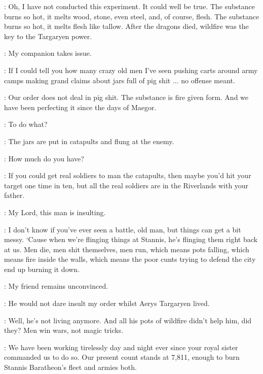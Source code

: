 \HALLYN: Oh, I have not conducted this experiment. It could well be true. The substance burns so hot, it melts wood, stone, even steel, and, of course, flesh. The substance burns so hot, it melts flesh like tallow. After the dragons died, wildfire was the key to the Targaryen power. 


\TYRION: My companion takes issue. 

\BRONN: If I could tell you how many crazy old men I've seen pushing carts around army camps making grand claims about jars full of pig shit $\ldots$ no offense meant. 

\HALLYN: Our order does not deal in pig shit. The substance is fire given form. And we have been perfecting it since the days of Maegor. 

\BRONN: To do what? 

\HALLYN: The jars are put in catapults and flung at the enemy. 

\TYRION: How much do you have? 


\BRONN: If you could get real soldiers to man the catapults, then maybe you'd hit your target one time in ten, but all the real soldiers are in the Riverlands with your father. 

\HALLYN: My Lord, this man is insulting. 


\BRONN: I don't know if you've ever seen a battle, old man, but things can get a bit messy. `Cause when we're flinging things at Stannis, he's flinging them right back at us. Men die, men shit themselves, men run, which means pots falling, which means fire inside the walls, which means the poor cunts trying to defend the city end up burning it down. 

\TYRION: My friend remains unconvinced. 

\HALLYN: He would not dare insult my order whilst Aerys Targaryen lived. 

\BRONN: Well, he's not living anymore. And all his pots of wildfire didn't help him, did they? Men win wars, not magic tricks. 


\HALLYN: We have been working tirelessly day and night ever since your royal sister commanded us to do so. Our present count stands at 7,811, enough to burn Stannis Baratheon's fleet and armies both. 

